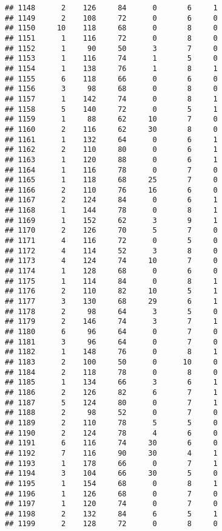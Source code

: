 \documentclass[
]{article}
\begin{document}
\begin{verbatim}
## 1148      2    126     84      0       6     1
## 1149      2    108     72      0       6     0
## 1150     10    118     68      0       8     0
## 1151      1    116     72      0       8     0
## 1152      1     90     50      3       7     0
## 1153      1    116     74      1       5     0
## 1154      1    138     76      1       8     1
## 1155      6    118     66      0       6     0
## 1156      3     98     68      0       8     0
## 1157      1    142     74      0       8     1
## 1158      5    140     72      0       5     1
## 1159      1     88     62     10       7     0
## 1160      2    116     62     30       8     0
## 1161      1    132     64      0       6     1
## 1162      2    110     80      0       6     1
## 1163      1    120     88      0       6     1
## 1164      1    116     78      0       7     0
## 1165      1    118     68     25       7     0
## 1166      2    110     76     16       6     0
## 1167      2    124     84      0       6     1
## 1168      1    144     78      0       8     1
## 1169      1    152     62      3       9     1
## 1170      2    126     70      5       7     0
## 1171      4    116     72      0       5     0
## 1172      4    114     52      3       8     0
## 1173      4    124     74     10       7     0
## 1174      1    128     68      0       6     0
## 1175      1    114     84      0       8     1
## 1176      2    110     82     10       5     1
## 1177      3    130     68     29       6     1
## 1178      2     98     64      3       5     0
## 1179      2    146     74      3       7     1
## 1180      6     96     64      0       7     0
## 1181      3     96     64      0       7     0
## 1182      1    148     76      0       8     1
## 1183      2    100     50      0      10     0
## 1184      2    118     78      0       8     0
## 1185      1    134     66      3       6     1
## 1186      2    126     82      6       7     1
## 1187      5    124     80      0       7     1
## 1188      2     98     52      0       7     0
## 1189      2    110     78      5       5     0
## 1190      2    124     78      4       6     0
## 1191      6    116     74     30       6     0
## 1192      7    116     90     30       4     1
## 1193      1    178     66      0       7     1
## 1194      3    104     66     30       5     0
## 1195      1    154     68      0       8     1
## 1196      1    126     68      0       7     0
## 1197      1    120     74      0       7     0
## 1198      2    132     84      6       5     1
## 1199      2    128     72      0       8     0

\end{verbatim}
\end{document}
